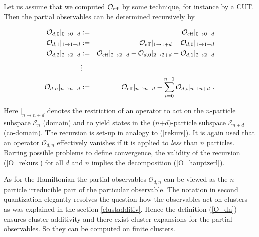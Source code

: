 Let us assume that we computed ${\mathcal O}_{\rm eff}$ by some technique,
for instance by a CUT. Then the partial observables can be determined
recursively by
\begin{mathletters}
\label{O_rekurs}
\begin{eqnarray}
\label{O_rekursa}
  {\mathcal O}_{d,0}|_{0\rightarrow 0+d}&:=& {\mathcal O}_{\rm
    eff}|_{0\rightarrow 0+d}\\
  {\mathcal O}_{d,1}|_{1\rightarrow 1+d} &:=& {\mathcal O}_{\rm
    eff}|_{1\rightarrow 1+d}- {\mathcal O}_{d,0}|_{1\rightarrow
    1+d}\\ \nonumber %
  {\mathcal O}_{d,2}|_{2\rightarrow 2+d} &:=& {\mathcal O}_{\rm
    eff}|_{2\rightarrow 2+d}- {\mathcal O}_{d,0}|_{2\rightarrow
    2+d}-{\mathcal O}_{d,1}|_{2\rightarrow 2+d}\\\nonumber
  &\vdots& \\
  {\mathcal O}_{d,n}|_{n\rightarrow n+d} &:=& {\mathcal O}_{\rm
    eff}|_{n\rightarrow n+d} - \sum_{i=0}^{n-1}{\mathcal
  O}_{d,i}|_{n\rightarrow n+d}\ .
\end{eqnarray}
\end{mathletters}
Here $|_{n\rightarrow n+d}$ denotes the restriction of an operator to
act on the $n$-particle subspace ${\mathcal E}_n$ (domain) and to yield
states in the $(n$+$d)$-particle subspace ${\mathcal E}_{n+d}$ (co-domain). 
The recursion is set-up in analogy to (\ref{rekurs}). It is again used
that an operator ${\mathcal O}_{d,n}$ effectively vanishes if it is applied
to {\it less} than $n$ particles. Barring possible problems to define
convergence, the validity of the recursion (\ref{O_rekurs}) for
all $d$ and $n$ implies the decomposition (\ref{O_hauptzerl}).

As for the Hamiltonian the partial observables ${\mathcal O}_{d,n}$ 
can be viewed as the $n$-particle irreducible part of the particular
observable. The notation in second quantization elegantly resolves the
question how the observables act on clusters as was explained in the
section \ref{clustadditiv}. Hence the definition (\ref{O_dn}) ensures
cluster additivity and there exist cluster expansions for
the partial observables. So they can be computed on finite clusters.

